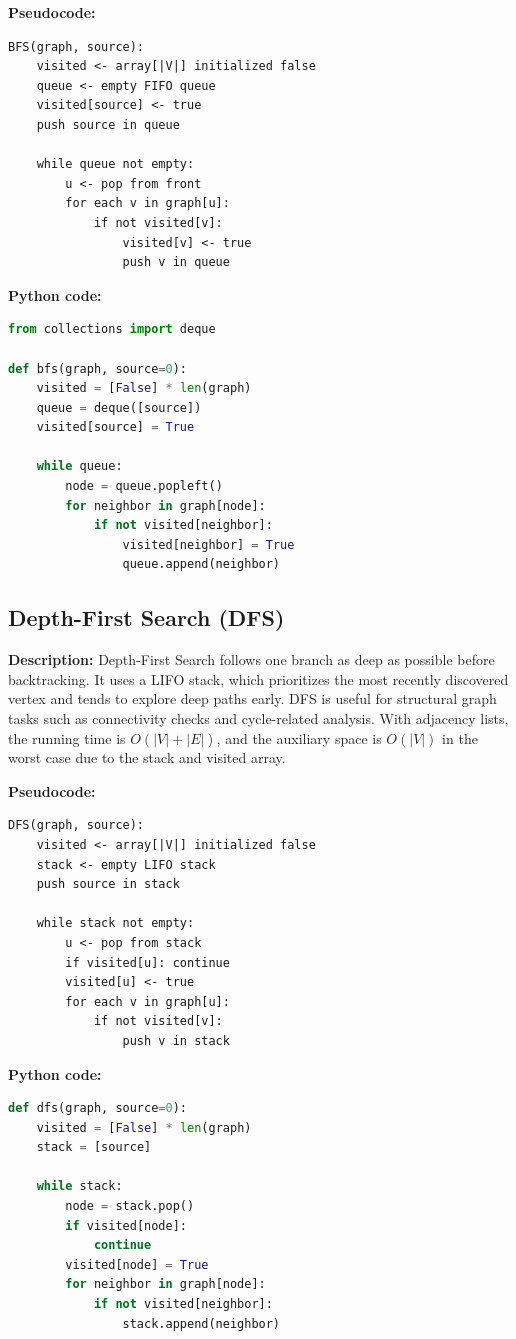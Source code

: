 \documentclass{labreport}
\begin{document}
\textbf{Pseudocode:}
\begin{lstlisting}
BFS(graph, source):
    visited <- array[|V|] initialized false
    queue <- empty FIFO queue
    visited[source] <- true
    push source in queue

    while queue not empty:
        u <- pop from front
        for each v in graph[u]:
            if not visited[v]:
                visited[v] <- true
                push v in queue
\end{lstlisting}

\textbf{Python code:}
\begin{lstlisting}[language=Python]
from collections import deque

def bfs(graph, source=0):
    visited = [False] * len(graph)
    queue = deque([source])
    visited[source] = True

    while queue:
        node = queue.popleft()
        for neighbor in graph[node]:
            if not visited[neighbor]:
                visited[neighbor] = True
                queue.append(neighbor)
\end{lstlisting}

\subsection{Depth-First Search (DFS)}
\textbf{Description:} Depth-First Search follows one branch as deep as possible before backtracking. It uses a LIFO stack, which prioritizes the most recently discovered vertex and tends to explore deep paths early. DFS is useful for structural graph tasks such as connectivity checks and cycle-related analysis. With adjacency lists, the running time is $O(|V|+|E|)$, and the auxiliary space is $O(|V|)$ in the worst case due to the stack and visited array.

\textbf{Pseudocode:}
\begin{lstlisting}
DFS(graph, source):
    visited <- array[|V|] initialized false
    stack <- empty LIFO stack
    push source in stack

    while stack not empty:
        u <- pop from stack
        if visited[u]: continue
        visited[u] <- true
        for each v in graph[u]:
            if not visited[v]:
                push v in stack
\end{lstlisting}

\textbf{Python code:}
\begin{lstlisting}[language=Python]
def dfs(graph, source=0):
    visited = [False] * len(graph)
    stack = [source]

    while stack:
        node = stack.pop()
        if visited[node]:
            continue
        visited[node] = True
        for neighbor in graph[node]:
            if not visited[neighbor]:
                stack.append(neighbor)
\end{lstlisting}
\end{document}
